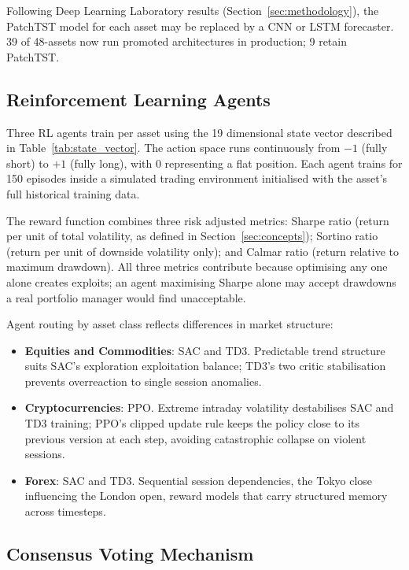 \documentclass[journal]{IEEEtran}
\begin{document}
Following Deep Learning Laboratory results (Section~\ref{sec:methodology}),
the PatchTST model for each asset may be replaced by a CNN or LSTM
forecaster. 39 of 48-assets now run promoted architectures in production;
9 retain PatchTST.

\subsection{Reinforcement Learning Agents}

Three RL agents train per asset using the 19 dimensional state vector
described in Table~\ref{tab:state_vector}. The action space runs
continuously from $-1$ (fully short) to $+1$ (fully long), with $0$
representing a flat position. Each agent trains for 150 episodes inside
a simulated trading environment initialised with the asset's full
historical training data.

The reward function combines three risk adjusted metrics: Sharpe ratio
(return per unit of total volatility, as defined in
Section~\ref{sec:concepts}); Sortino ratio (return per unit of downside
volatility only); and Calmar ratio (return relative to maximum drawdown).
All three metrics contribute because optimising any one alone creates
exploits; an agent maximising Sharpe alone may accept drawdowns a real
portfolio manager would find unacceptable.

Agent routing by asset class reflects differences in market structure:
\begin{itemize}
\item \textbf{Equities and Commodities}: SAC and TD3. Predictable trend
      structure suits SAC's exploration exploitation balance; TD3's two
      critic stabilisation prevents overreaction to single session
      anomalies.
\item \textbf{Cryptocurrencies}: PPO. Extreme intraday volatility
      destabilises SAC and TD3 training; PPO's clipped update rule
      keeps the policy close to its previous version at each step,
      avoiding catastrophic collapse on violent sessions.
\item \textbf{Forex}: SAC and TD3. Sequential session dependencies,
      the Tokyo close influencing the London open, reward models
      that carry structured memory across timesteps.
\end{itemize}

\subsection{Consensus Voting Mechanism}
\end{document}
